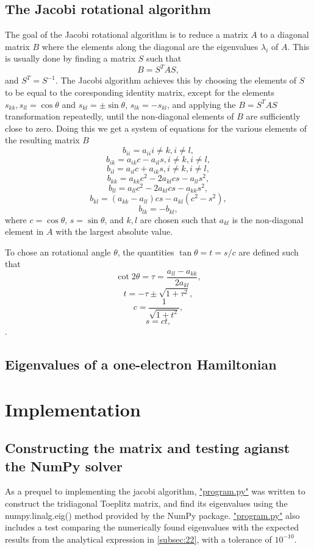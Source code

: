 \documentclass[english,notitlepage,reprint]{revtex4-1}  %
\begin{document}
\subsection{The Jacobi rotational algorithm}\label{subsec:22}
The goal of the Jacobi rotational algorithm is to reduce a matrix \(A\) to a diagonal matrix \(B\) where the elements along the diagonal are the eigenvalues \(\lambda_{i}\) of \(A\). This is usually done by finding a matrix \(S\) such that
$$
	B = S^{T}AS,
$$
and \(S^{T}=S^{-1}\)\citep{Hjorth-Jensen2019}. The Jacobi algorithm achieves this by choosing the elements of \(S\) to be equal to the coresponding identity matrix, except for the elements \(s_{kk},s_{ll}=\cos\theta\) and \(s_{kl} = \pm \sin\theta\), \(s_{lk} = -s_{kl}\)\citep{Hjorth-Jensen2019}, and applying the \(B = S^{T}AS\) transformation repeatedly, until the non-diagonal elements of \(B\) are sufficiently close to zero. Doing this we get a system of equations for the various elements of the resulting matrix \(B\)
$$
	b_{ii}=a_{ii} i\neq k, i\neq l,
$$
$$
	b_{ik}=a_{ik}c-a_{il}s, i\neq k, i\neq l,
$$
$$
	b_{il}=a_{il}c+a_{ik}s, i\neq k, i\neq l,
$$
$$
	b_{kk}=a_{kk}c^{2}-2a_{kl}cs-a_{ll}s^{2},
$$
$$
	b_{ll}=a_{ll}c^{2}-2a_{kl}cs-a_{kk}s^{2},
$$
$$
	b_{kl}=\left(a_{kk}-a_{ll}\right)cs-a_{kl}\left(c^{2}-s^{2}\right),
$$
$$
	b_{lk}=-b_{kl},
$$
where \(c = \cos\theta\), \(s = \sin\theta\), and \(k,l\) are chosen such that \(a_{kl}\) is the non-diagonal element in \(A\) with the largest absolute value.

To chose an rotational angle \(\theta\), the quantities \(\tan\theta=t=s/c\) are defined such that
$$
	\cot 2\theta = \tau = \frac{a_{ll}-a_{kk}}{2a_{kl}},
$$
$$
	t = -\tau \pm \sqrt{1+\tau^{2}},
$$
$$
	c = \frac{1}{\sqrt{1+t^{2}}},
$$
$$
	s = ct,
$$
\citep{Hjorth-Jensen2019}.

\subsection{Eigenvalues of a one-electron Hamiltonian}\label{subsec:23}

\section{Implementation}\label{sec:3}
\subsection{Constructing the matrix and testing agianst the NumPy solver}\label{subsec:31}
As a prequel to implementing the jacobi algorithm, \hyperref[A:1]{"program.py"} was written to construct the tridiagonal Toeplitz matrix, and find its eigenvalues using the numpy.linalg.eig() method provided by the NumPy package. \hyperref[A:1]{"program.py"} also includes a test comparing the numerically found eigenvalues with the expected results from the analytical expression in \autoref{subsec:22}, with a tolerance of \(10^{-10}\).
\end{document}
